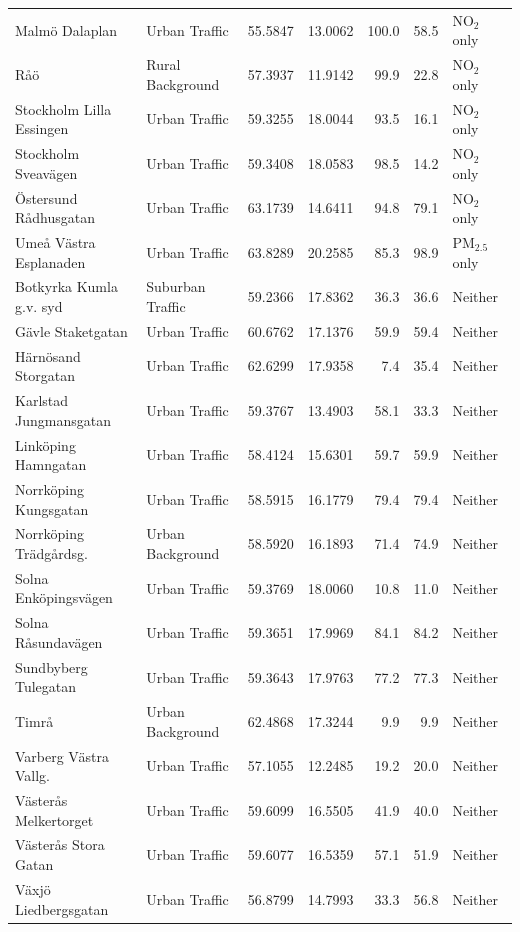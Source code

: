 \documentclass[11pt,a4paper]{article}
\begin{document}
\begin{longtable}{p{4.1cm}p{2.6cm}rrrrp{2.7cm}}
Malmö Dalaplan & Urban Traffic & 55.5847 & 13.0062 & 100.0 & 58.5 & NO$_2$ only \\
Råö & Rural Background & 57.3937 & 11.9142 & 99.9 & 22.8 & NO$_2$ only \\
Stockholm Lilla Essingen & Urban Traffic & 59.3255 & 18.0044 & 93.5 & 16.1 & NO$_2$ only \\
Stockholm Sveavägen & Urban Traffic & 59.3408 & 18.0583 & 98.5 & 14.2 & NO$_2$ only \\
Östersund Rådhusgatan & Urban Traffic & 63.1739 & 14.6411 & 94.8 & 79.1 & NO$_2$ only \\
Umeå Västra Esplanaden & Urban Traffic & 63.8289 & 20.2585 & 85.3 & 98.9 & PM$_{2.5}$ only \\
Botkyrka Kumla g.v. syd & Suburban Traffic & 59.2366 & 17.8362 & 36.3 & 36.6 & Neither \\
Gävle Staketgatan & Urban Traffic & 60.6762 & 17.1376 & 59.9 & 59.4 & Neither \\
Härnösand Storgatan & Urban Traffic & 62.6299 & 17.9358 & 7.4 & 35.4 & Neither \\
Karlstad Jungmansgatan & Urban Traffic & 59.3767 & 13.4903 & 58.1 & 33.3 & Neither \\
Linköping Hamngatan & Urban Traffic & 58.4124 & 15.6301 & 59.7 & 59.9 & Neither \\
Norrköping Kungsgatan & Urban Traffic & 58.5915 & 16.1779 & 79.4 & 79.4 & Neither \\
Norrköping Trädgårdsg. & Urban Background & 58.5920 & 16.1893 & 71.4 & 74.9 & Neither \\
Solna Enköpingsvägen & Urban Traffic & 59.3769 & 18.0060 & 10.8 & 11.0 & Neither \\
Solna Råsundavägen & Urban Traffic & 59.3651 & 17.9969 & 84.1 & 84.2 & Neither \\
Sundbyberg Tulegatan & Urban Traffic & 59.3643 & 17.9763 & 77.2 & 77.3 & Neither \\
Timrå & Urban Background & 62.4868 & 17.3244 & 9.9 & 9.9 & Neither \\
Varberg Västra Vallg. & Urban Traffic & 57.1055 & 12.2485 & 19.2 & 20.0 & Neither \\
Västerås Melkertorget & Urban Traffic & 59.6099 & 16.5505 & 41.9 & 40.0 & Neither \\
Västerås Stora Gatan & Urban Traffic & 59.6077 & 16.5359 & 57.1 & 51.9 & Neither \\
Växjö Liedbergsgatan & Urban Traffic & 56.8799 & 14.7993 & 33.3 & 56.8 & Neither \\
\end{longtable}
\end{document}
